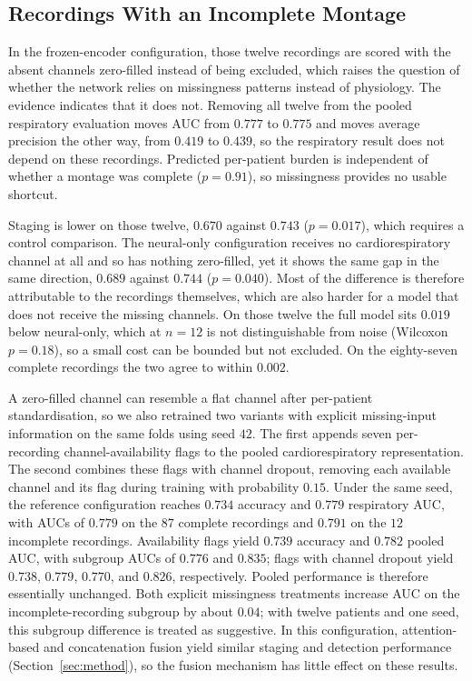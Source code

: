 \documentclass[a4paper,fleqn]{cas-sc}
\begin{document}
\subsection{Recordings With an Incomplete Montage}
In the frozen-encoder configuration, those twelve recordings are scored with the absent channels zero-filled instead of being excluded, which raises the question of whether the network relies on missingness patterns instead of physiology. The evidence indicates that it does not. Removing all twelve from the pooled respiratory evaluation moves AUC from $0.777$ to $0.775$ and moves average precision the other way, from $0.419$ to $0.439$, so the respiratory result does not depend on these recordings. Predicted per-patient burden is independent of whether a montage was complete ($p=0.91$), so missingness provides no usable shortcut.

Staging is lower on those twelve, $0.670$ against $0.743$ ($p=0.017$), which requires a control comparison. The neural-only configuration receives no
cardiorespiratory channel at all and so has nothing zero-filled, yet it shows the same
gap in the same direction, $0.689$ against $0.744$ ($p=0.040$). Most of the difference is therefore attributable to the recordings themselves, which are also harder for a model that does not receive the missing channels. On those twelve the
full model sits $0.019$ below neural-only, which at $n=12$ is not distinguishable from
noise (Wilcoxon $p=0.18$), so a small cost can be bounded but not excluded. On the
eighty-seven complete recordings the two agree to within $0.002$.

A zero-filled channel can resemble a flat channel after per-patient standardisation, so we
also retrained two variants with explicit missing-input information on the same folds using
seed $42$. The first appends seven per-recording channel-availability flags to the pooled
cardiorespiratory representation. The second combines these flags with channel dropout,
removing each available channel and its flag during training with probability $0.15$. Under
the same seed, the reference configuration reaches $0.734$ accuracy and $0.779$ respiratory
AUC, with AUCs of $0.779$ on the $87$ complete recordings and $0.791$ on the $12$ incomplete
recordings. Availability flags yield $0.739$ accuracy and $0.782$ pooled AUC, with subgroup
AUCs of $0.776$ and $0.835$; flags with channel dropout yield $0.738$, $0.779$, $0.770$, and
$0.826$, respectively. Pooled performance is therefore essentially unchanged. Both explicit
missingness treatments increase AUC on the incomplete-recording subgroup by about $0.04$;
with twelve patients and one seed, this subgroup difference is treated as suggestive.
In this configuration, attention-based and concatenation fusion yield similar staging and detection performance (Section~\ref{sec:method}), so the fusion mechanism has little effect on these results.
\end{document}
